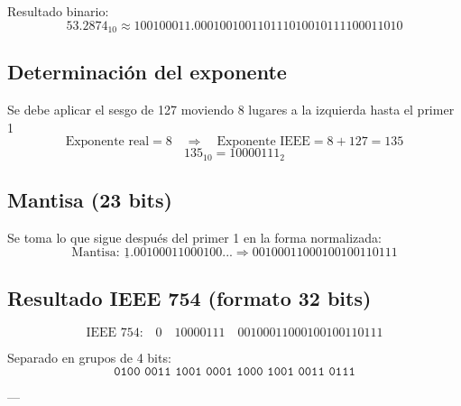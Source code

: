 \documentclass[a4paper,12pt]{article}
\begin{document}
\begin{center}
		Resultado binario: 
		\[
		53.2874_{10} \approx 100100011.000100100110111010010111100011010
		\]
		
		\subsection*{Determinación del exponente}
		
		Se debe aplicar el sesgo de 127 moviendo 8 lugares a la izquierda hasta el primer 1
		\vspace{-0.5em}
		\[
		\text{Exponente real} = 8 \quad \Rightarrow \quad \text{Exponente IEEE} = 8 + 127 = 135
		\]
		\vspace{-0.5em}
		\[
		135_{10} = 10000111_2
		\]
		
		\subsection*{Mantisa (23 bits)}
		
		Se toma lo que sigue después del primer 1 en la forma normalizada:
		\vspace{-0.5em}
		\[
		\text{Mantisa: } \underline{1}.00100011000100... \Rightarrow 00100011000100100110111
		\]
		
		\subsection*{Resultado IEEE 754 (formato 32 bits)}
		
		\[
		\text{IEEE 754:} \quad 
		\boxed{0} \quad \boxed{10000111} \quad \boxed{00100011000100100110111}
		\]
		
		Separado en grupos de 4 bits:
		\vspace{-0.5em}
		\[
		\texttt{0100\ 0011\ 1001\ 0001\ 1000\ 1001\ 0011\ 0111}
		\]

		---	
	\end{center}
\end{document}
